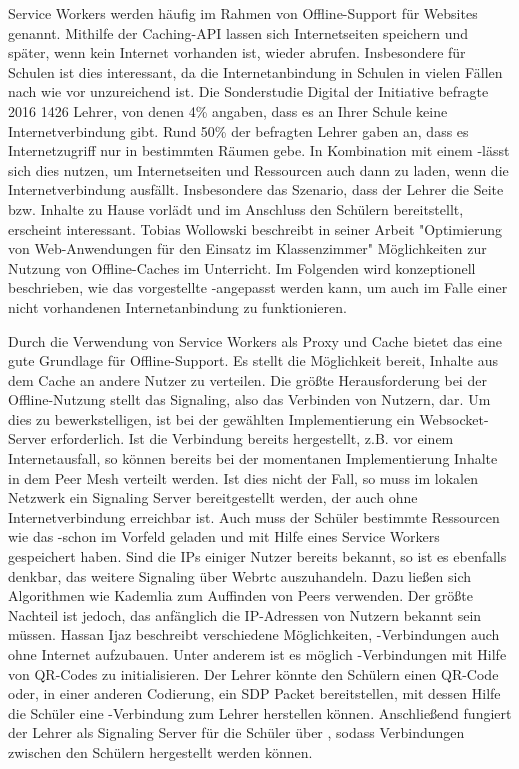 Service Workers werden häufig im Rahmen von Offline-Support für Websites genannt. Mithilfe der Caching-API lassen sich Internetseiten speichern und später, wenn kein Internet vorhanden ist, wieder abrufen. Insbesondere für Schulen ist dies interessant, da die Internetanbindung in Schulen in vielen Fällen nach wie vor unzureichend ist. Die Sonderstudie Digital der Initiative befragte 2016 1426 Lehrer, von denen 4\% angaben, dass es an Ihrer Schule keine Internetverbindung gibt. Rund 50\% der befragten Lehrer gaben an, dass es Internetzugriff nur in bestimmten Räumen gebe.\cite{sonderstudie_digital} In Kombination mit einem \pTp-\cdn lässt sich dies nutzen, um Internetseiten und Ressourcen auch dann zu laden, wenn die Internetverbindung ausfällt. Insbesondere das Szenario, dass der Lehrer die Seite bzw. Inhalte zu Hause vorlädt und im Anschluss den Schülern bereitstellt, erscheint interessant. Tobias Wollowski beschreibt in seiner Arbeit "Optimierung von Web-Anwendungen für den Einsatz im Klassenzimmer"\cite{tobi} Möglichkeiten zur Nutzung von Offline-Caches im Unterricht. Im Folgenden wird konzeptionell beschrieben, wie das vorgestellte \pTp-\cdn angepasst werden kann, um auch im Falle einer nicht vorhandenen Internetanbindung zu funktionieren.

Durch die Verwendung von Service Workers als Proxy und Cache bietet das \cdn eine gute Grundlage für Offline-Support. Es stellt die Möglichkeit bereit, Inhalte aus dem Cache an andere Nutzer zu verteilen. Die größte Herausforderung bei der Offline-Nutzung stellt das Signaling, also das Verbinden von Nutzern, dar. Um dies zu bewerkstelligen, ist bei der gewählten Implementierung ein Websocket-Server erforderlich. Ist die Verbindung bereits hergestellt, z.B. vor einem Internetausfall, so können bereits bei der momentanen Implementierung Inhalte in dem Peer Mesh verteilt werden. Ist dies nicht der Fall, so muss im lokalen Netzwerk ein Signaling Server bereitgestellt werden, der auch ohne Internetverbindung erreichbar ist. Auch muss der Schüler bestimmte Ressourcen wie das \pTp-\cdn schon im Vorfeld geladen und mit Hilfe eines Service Workers gespeichert haben. Sind die IPs einiger Nutzer bereits bekannt, so ist es ebenfalls denkbar, das weitere Signaling über Webrtc auszuhandeln. Dazu ließen sich Algorithmen wie Kademlia\cite{kademlia} zum Auffinden von Peers verwenden. Der größte Nachteil ist jedoch, das anfänglich die IP-Adressen von Nutzern bekannt sein müssen. Hassan Ijaz\cite{signaling_no_i_patent} beschreibt verschiedene Möglichkeiten, \webrtc-Verbindungen auch ohne Internet aufzubauen. Unter anderem ist es möglich \webrtc-Verbindungen mit Hilfe von QR-Codes zu initialisieren. Der Lehrer könnte den Schülern einen QR-Code oder, in einer anderen Codierung, ein SDP Packet bereitstellen, mit dessen Hilfe die Schüler eine \webrtc-Verbindung zum Lehrer herstellen können. Anschließend fungiert der Lehrer als Signaling Server für die Schüler über \webrtc, sodass Verbindungen zwischen den Schülern hergestellt werden können.

